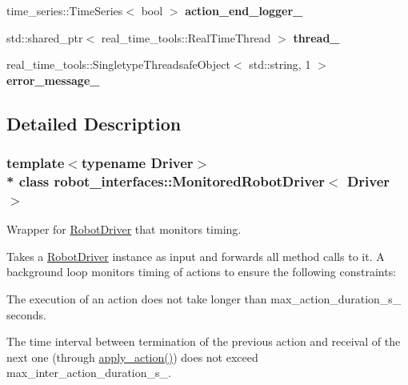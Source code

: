 \begin{DoxyCompactItemize}
\item 
time\+\_\+series\+::\+Time\+Series$<$ bool $>$ {\bfseries action\+\_\+end\+\_\+logger\+\_\+}\hypertarget{classrobot__interfaces_1_1MonitoredRobotDriver_a469ee1c7ec3565e391c9ac1758b702f6}{}\label{classrobot__interfaces_1_1MonitoredRobotDriver_a469ee1c7ec3565e391c9ac1758b702f6}

\item 
std\+::shared\+\_\+ptr$<$ real\+\_\+time\+\_\+tools\+::\+Real\+Time\+Thread $>$ {\bfseries thread\+\_\+}\hypertarget{classrobot__interfaces_1_1MonitoredRobotDriver_aaa3c0cd73914d3d3118a78252ed13631}{}\label{classrobot__interfaces_1_1MonitoredRobotDriver_aaa3c0cd73914d3d3118a78252ed13631}

\item 
real\+\_\+time\+\_\+tools\+::\+Singletype\+Threadsafe\+Object$<$ std\+::string, 1 $>$ {\bfseries error\+\_\+message\+\_\+}\hypertarget{classrobot__interfaces_1_1MonitoredRobotDriver_a123c65db418751fccfd681e0cc53348a}{}\label{classrobot__interfaces_1_1MonitoredRobotDriver_a123c65db418751fccfd681e0cc53348a}

\end{DoxyCompactItemize}


\subsection{Detailed Description}
\subsubsection*{template$<$typename Driver$>$\\*
class robot\+\_\+interfaces\+::\+Monitored\+Robot\+Driver$<$ Driver $>$}

Wrapper for \hyperlink{classrobot__interfaces_1_1RobotDriver}{Robot\+Driver} that monitors timing. 

Takes a \hyperlink{classrobot__interfaces_1_1RobotDriver}{Robot\+Driver} instance as input and forwards all method calls to it. A background loop monitors timing of actions to ensure the following constraints\+:


\begin{DoxyEnumerate}
\item The execution of an action does not take longer than {\ttfamily max\+\_\+action\+\_\+duration\+\_\+s\+\_\+} seconds.
\item The time interval between termination of the previous action and receival of the next one (through {\ttfamily \hyperlink{classrobot__interfaces_1_1MonitoredRobotDriver_a3f0f7cbf74236e91d33dcfc08206b5e9}{apply\+\_\+action()}}) does not exceed {\ttfamily max\+\_\+inter\+\_\+action\+\_\+duration\+\_\+s\+\_\+}.
\end{DoxyEnumerate}

